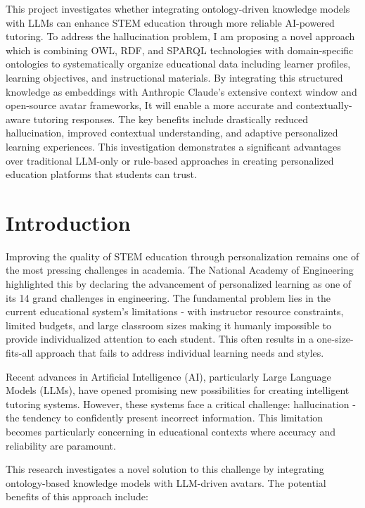 \documentclass[a4paper,11pt,oneside]{article}
\begin{document}
  This project investigates whether integrating ontology-driven knowledge models with LLMs can enhance STEM education through more 
  reliable AI-powered tutoring. To address the hallucination problem, I am proposing a novel approach which is combining OWL, RDF, and SPARQL technologies 
  with domain-specific ontologies to systematically organize educational data including learner profiles, learning objectives, and instructional materials. 
  By integrating this structured knowledge as embeddings with Anthropic Claude's extensive context window and open-source avatar frameworks, 
  It will enable a more accurate and contextually-aware tutoring responses. The key benefits include drastically reduced hallucination, 
  improved contextual understanding, and adaptive personalized learning experiences. This investigation demonstrates a significant 
  advantages over traditional LLM-only or rule-based approaches in creating personalized education platforms that students can trust.

  \newpage
  \tableofcontents

  \clearpage

  \section{Introduction}

  Improving the quality of STEM education through personalization remains one of the most pressing challenges in academia. The National Academy of Engineering 
  highlighted this by declaring the advancement of personalized learning as one of its 14 grand challenges in engineering. The fundamental problem lies in the 
  current educational system's limitations - with instructor resource constraints, limited budgets, and large classroom sizes making it humanly impossible to 
  provide individualized attention to each student. This often results in a one-size-fits-all approach that fails to address individual learning needs and styles.

  Recent advances in Artificial Intelligence (AI), particularly Large Language Models (LLMs), have opened promising new possibilities for creating intelligent 
  tutoring systems. However, these systems face a critical challenge: hallucination - the tendency to confidently present incorrect information. This limitation 
  becomes particularly concerning in educational contexts where accuracy and reliability are paramount.

  This research investigates a novel solution to this challenge by integrating ontology-based knowledge models with LLM-driven avatars. The potential benefits 
  of this approach include:
\end{document}
